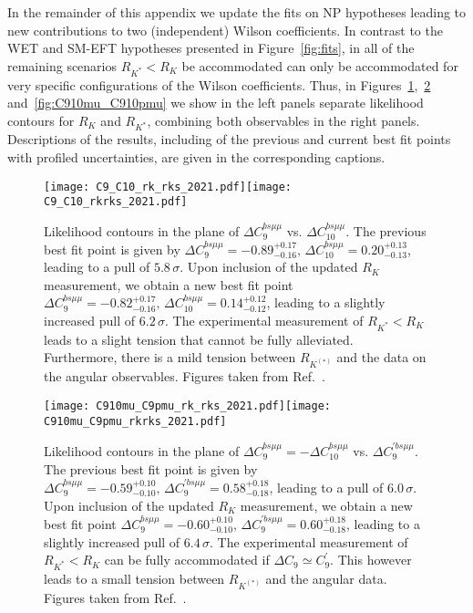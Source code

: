 \documentclass[a4paper,11pt]{article}
\def\rkrks{R_{K^{(\ast)}}}
\def\rk{R_{K}}
\def\rks{R_{K^\ast}}
\begin{document}
In the remainder of this appendix we update the fits on NP hypotheses leading to new contributions to two (independent) Wilson coefficients. 
In contrast to the WET and SM-EFT hypotheses presented in Figure~\ref{fig:fits}, in all of the remaining scenarios 
$\rks < \rk$ be accommodated can only be accommodated for 
very specific configurations of the Wilson coefficients.
Thus, in Figures~\ref{fig:C9_C10},~\ref{fig:C910mu_C9pmu} and~\ref{fig:C910mu_C910pmu} we show in the left panels separate likelihood contours for $\rk$ and $\rks$, combining both observables in the right panels.
Descriptions of the results, including of the previous and current best fit points with profiled uncertainties, are given in the corresponding captions. 
\begin{figure}[h!]
    \centering
    \texttt{[image: C9\_C10\_rk\_rks\_2021.pdf]}\texttt{[image: C9\_C10\_rkrks\_2021.pdf]}
    \caption{Likelihood contours in the plane of $\Delta C_9^{bs\mu\mu}$ vs. $\Delta C_{10}^{bs\mu\mu}$. The previous best fit point is given by $\Delta C_9^{bs\mu\mu} = -0.89^{+0.17}_{-0.16},\,\Delta C_{10}^{bs\mu\mu} = 0.20^{+0.13}_{-0.13}$, leading to a pull of $5.8\,\sigma$. Upon inclusion of the updated $\rk$ measurement, we obtain a new best fit point  $\Delta C_9^{bs\mu\mu} = {-0.82}^{+0.17}_{-0.16},\,\Delta C_{10}^{bs\mu\mu} = {0.14}^{+0.12}_{-0.12}$, leading to a slightly increased pull of $6.2\,\sigma$. The experimental measurement of $\rks < \rk$ leads to a slight tension that cannot be fully alleviated. Furthermore, there is a mild tension between $\rkrks$ and the data on the angular observables. Figures taken from Ref.~\cite{talk}.}
    \label{fig:C9_C10}
\end{figure}
% 
\begin{figure}[h!]
    \centering
    \texttt{[image: C910mu\_C9pmu\_rk\_rks\_2021.pdf]}\texttt{[image: C910mu\_C9pmu\_rkrks\_2021.pdf]}
    \caption{Likelihood contours in the plane of $\Delta C_9^{bs\mu\mu} = -\Delta C_{10}^{bs\mu\mu}$ vs. $\Delta C_{9}^{\prime bs\mu\mu}$. The previous best fit point is given by $\Delta C_9^{bs\mu\mu} = -0.59^{+0.10}_{-0.10},\,\Delta C_{9}^{\prime bs\mu\mu} = 0.58^{+0.18}_{-0.18}$, leading to a pull of $6.0\,\sigma$. Upon inclusion of the updated $\rk$ measurement, we obtain a new best fit point $\Delta C_9^{bs\mu\mu} =  -0.60^{+0.10}_{-0.10},\,\Delta C_{9}^{\prime bs\mu\mu} = 0.60^{+0.18}_{-0.18}$, leading to a slightly increased pull of $6.4\,\sigma$. The experimental measurement of $\rks < \rk$ can be fully accommodated if $\Delta C_9 \simeq C_9^\prime$. This however leads to a small tension between $\rkrks$ and the angular data. Figures taken from Ref.~\cite{talk}.}
    \label{fig:C910mu_C9pmu}
\end{figure}
\end{document}
